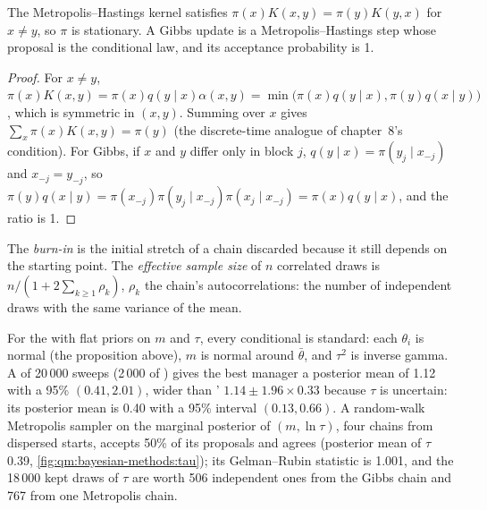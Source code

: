 \begin{proposition}\label{prop:qm:bayesian-methods:mh}
The Metropolis--Hastings kernel satisfies $\pi(x)K(x, y) = \pi(y)K(y, x)$ for $x \ne y$, so $\pi$ is stationary. A Gibbs update is a
Metropolis--Hastings step whose proposal is the conditional law, and its acceptance probability is 1.
\end{proposition}

\begin{proof}
For $x \ne y$, $\pi(x)K(x, y) = \pi(x)q(y \mid x)\alpha(x, y) = \min\bigl(\pi(x)q(y \mid x), \pi(y)q(x \mid y)\bigr)$, which is symmetric in
$(x, y)$. Summing  over $x$ gives $\sum_x\pi(x)K(x, y) = \pi(y)$ (the discrete-time analogue of chapter~8's
condition). For Gibbs, if $x$ and $y$ differ only in block $j$, $q(y \mid x) = \pi(y_j \mid x_{-j})$ and $x_{-j} = y_{-j}$, so
$\pi(y)q(x \mid y) = \pi(x_{-j})\pi(y_j \mid x_{-j})\pi(x_j \mid x_{-j}) = \pi(x)q(y \mid x)$, and the ratio is 1.
\end{proof}

\begin{definition}\label{def:qm:bayesian-methods:ess}
The \emph{burn-in} is the initial stretch of a chain discarded because it still depends on the starting point. The
\emph{effective sample size} of $n$ correlated draws is $n/(1 + 2\sum_{k \ge 1}\rho_k)$, $\rho_k$ the chain's
autocorrelations: the number of independent draws with the same variance of the mean.
\end{definition}

For the  with flat priors on $m$ and $\tau$, every conditional is standard: each $\theta_i$ is normal (the proposition
above), $m$ is normal around $\bar\theta$, and $\tau^2$ is inverse gamma. A  of 20\,000 sweeps (2\,000 of ) gives the
best manager a posterior mean of 1.12 with a 95\%  $(0.41, 2.01)$, wider than ' $1.14 \pm 1.96 \times 0.33$
because $\tau$ is uncertain: its posterior mean is 0.40 with a 95\% interval $(0.13, 0.66)$. A random-walk Metropolis sampler on the
marginal posterior of $(m, \ln\tau)$, four chains from dispersed starts, accepts 50\% of its proposals and agrees (posterior mean of $\tau$
0.39, \cref{fig:qm:bayesian-methods:tau}); its Gelman--Rubin statistic is 1.001, and the 18\,000 kept draws of $\tau$ are worth 506
independent ones from the Gibbs chain and 767 from one Metropolis chain.

